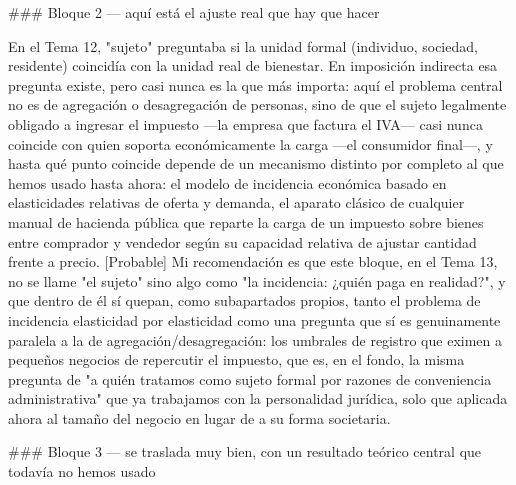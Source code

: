 \documentclass[10pt,a4paper]{article}
\begin{document}
### Bloque 2 — aquí está el ajuste real que hay que hacer

En el Tema 12, "sujeto" preguntaba si la unidad formal (individuo, sociedad, residente) coincidía con la unidad real de bienestar. En imposición indirecta esa pregunta existe, pero casi nunca es la que más importa: aquí el problema central no es de agregación o desagregación de personas, sino de que el sujeto legalmente obligado a ingresar el impuesto —la empresa que factura el IVA— casi nunca coincide con quien soporta económicamente la carga —el consumidor final—, y hasta qué punto coincide depende de un mecanismo distinto por completo al que hemos usado hasta ahora: el modelo de incidencia económica basado en elasticidades relativas de oferta y demanda, el aparato clásico de cualquier manual de hacienda pública que reparte la carga de un impuesto sobre bienes entre comprador y vendedor según su capacidad relativa de ajustar cantidad frente a precio. [Probable] Mi recomendación es que este bloque, en el Tema 13, no se llame "el sujeto" sino algo como "la incidencia: ¿quién paga en realidad?", y que dentro de él sí quepan, como subapartados propios, tanto el problema de incidencia elasticidad por elasticidad como una pregunta que sí es genuinamente paralela a la de agregación/desagregación: los umbrales de registro que eximen a pequeños negocios de repercutir el impuesto, que es, en el fondo, la misma pregunta de "a quién tratamos como sujeto formal por razones de conveniencia administrativa" que ya trabajamos con la personalidad jurídica, solo que aplicada ahora al tamaño del negocio en lugar de a su forma societaria.

### Bloque 3 — se traslada muy bien, con un resultado teórico central que todavía no hemos usado
\end{document}
